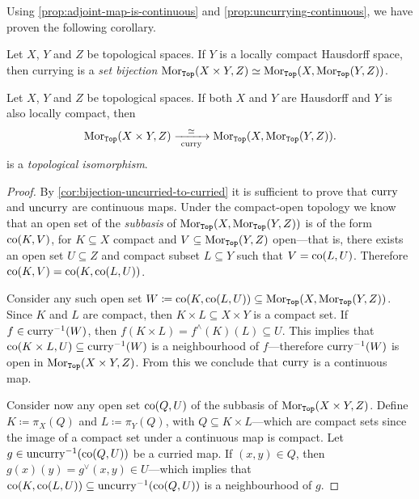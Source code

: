 Using \cref{prop:adjoint-map-is-continuous} and
\cref{prop:uncurrying-continuous}, we have proven the following corollary.

\begin{corollary}
    \label{cor:bijection-uncurried-to-curried}
    Let \(X\), \(Y\) and \(Z\) be topological spaces. If \(Y\) is a locally compact
    Hausdorff space, then currying is a \emph{set bijection}
    \(\operatorname{Mor}_{{\texttt{Top}}}(X \times Y, Z) \simeq \operatorname{Mor}_{{\texttt{Top}}}(X, \operatorname{Mor}_{{\texttt{Top}}}(Y, Z))\).
\end{corollary}

\begin{theorem}
    \label{thm:currying-top-iso}
    Let \(X\), \(Y\) and \(Z\) be topological spaces. If both \(X\) and \(Y\) are
    Hausdorff and \(Y\) is also locally compact, then
    \[
        \operatorname{Mor}_{{\texttt{Top}}}(X \times Y, Z)
        \xrightarrow[ \ \operatorname{curry}\ ]{\simeq} \operatorname{Mor}_{{\texttt{Top}}}(X, \operatorname{Mor}_{{\texttt{Top}}}(Y, Z)).
    \]
    is a \emph{topological isomorphism}.
\end{theorem}

\begin{proof}
    By \cref{cor:bijection-uncurried-to-curried} it is sufficient to prove that
    \(\operatorname{curry}\) and \(\operatorname{uncurry}\) are continuous maps. Under the compact-open topology
    we know that an open set of the \emph{subbasis} of
    \(\operatorname{Mor}_{{\texttt{Top}}}(X, \operatorname{Mor}_{{\texttt{Top}}}(Y, Z))\) is of the form \(\operatorname{co}(K, V)\), for
    \(K \subseteq X\) compact and \(V \subseteq \operatorname{Mor}_{{\texttt{Top}}}(Y, Z)\) open---that is,
    there exists an open set \(U \subseteq Z\) and compact subset \(L \subseteq Y\)
    such that \(V = \operatorname{co}(L, U)\). Therefore \(\operatorname{co}(K, V) = \operatorname{co}(K, \operatorname{co}(L, U))\).

    Consider any such open set
    \(W \coloneq \operatorname{co}(K, \operatorname{co}(L, U)) \subseteq \operatorname{Mor}_{{\texttt{Top}}}(X, \operatorname{Mor}_{{\texttt{Top}}}(Y, Z))\).
    Since \(K\) and \(L\) are compact, then \(K \times L \subseteq X \times Y\) is a
    compact set. If \(f \in \operatorname{curry}^{-1}(W)\), then
    \(f(K \times L) = f^{\wedge}(K)(L) \subseteq U\). This implies that
    \(\operatorname{co}(K \times L, U) \subseteq \operatorname{curry}^{-1}(W)\) is a neighbourhood of
    \(f\)---therefore \(\operatorname{curry}^{-1}(W)\) is open in \(\operatorname{Mor}_{{\texttt{Top}}}(X \times Y,
    Z)\). From this we conclude that \(\operatorname{curry}\) is a continuous map.

    Consider now any open set \(\operatorname{co}(Q, U)\) of the subbasis of
    \(\operatorname{Mor}_{{\texttt{Top}}}(X \times Y, Z)\). Define \(K \coloneq \pi_X(Q)\) and
    \(L \coloneq \pi_Y(Q)\), with \(Q \subseteq K \times L\)---which are compact
    sets since the image of a compact set under a continuous map is compact. Let
    \(g \in \operatorname{uncurry}^{-1}(\operatorname{co}(Q, U))\) be a curried map. If \((x, y) \in Q\), then
    \(g(x)(y) = g^{\vee}(x, y) \in U\)---which implies that \(\operatorname{co}(K, \operatorname{co}(L, U))
    \subseteq \operatorname{uncurry}^{-1}(\operatorname{co}(Q, U))\) is a neighbourhood of \(g\).
\end{proof}

